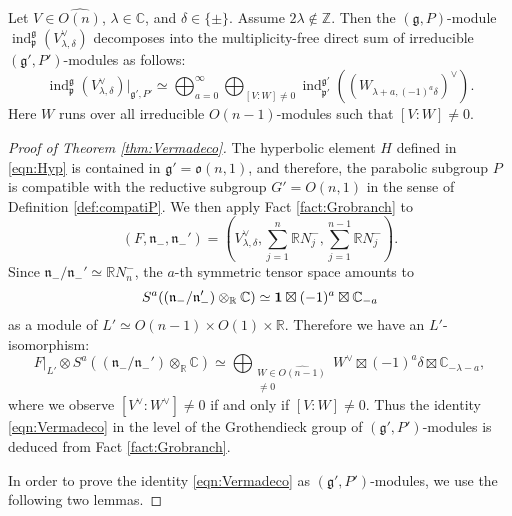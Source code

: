 \begin{theorem}
\label{thm:Vermadeco}
Let $V \in \widehat {O(n)}$, 
 $\lambda \in {\mathbb{C}}$, 
 and $\delta \in \{\pm\}$.  
Assume $2 \lambda \not \in {\mathbb{Z}}$.  
Then the $({\mathfrak{g}},P)$-module 
 ${\operatorname{ind}}_{\mathfrak{p}}^{\mathfrak{g}}
  (V_{\lambda,\delta}^{\vee})$ decomposes
 into the multiplicity-free direct sum of irreducible $({\mathfrak{g}}',P')$-modules
 as follows:
\begin{equation}
\label{eqn:Vermadeco}
 {\operatorname{ind}}_{\mathfrak{p}}^{\mathfrak{g}}
  (V_{\lambda,\delta}^{\vee})|_{{\mathfrak{g}}',P'}
  \simeq
  \bigoplus_{a=0}^{\infty}
  \bigoplus_{[V:W]\ne 0}
  {\operatorname{ind}}_{\mathfrak{p}'}^{\mathfrak{g}'}
   ((W_{\lambda+a,(-1)^a\delta})^{\vee}).  
\end{equation}
Here $W$ runs over all irreducible $O(n-1)$-modules
 such that $[V:W] \ne 0$.  
\end{theorem}

\begin{proof}
[Proof of Theorem \ref{thm:Vermadeco}]
The hyperbolic element $H$ defined in \eqref{eqn:Hyp}
 is contained in ${\mathfrak{g}}' = {\mathfrak{o}}(n,1)$, 
 and therefore, 
 the parabolic subgroup $P$
 is compatible with the reductive subgroup $G'=O(n,1)$
 in the sense of Definition \ref{def:compatiP}.  
We then apply Fact \ref{fact:Grobranch}
 to 
\[
  (F,{\mathfrak{n}}_-,{\mathfrak{n}}_-')
  =
  (V_{\lambda,\delta}^{\vee}, \sum_{j=1}^{n}{\mathbb{R}}N_j^-, \sum_{j=1}^{n-1}{\mathbb{R}}N_j^-).  
\]
Since ${\mathfrak{n}}_-/{\mathfrak{n}}_-' \simeq {\mathbb{R}}N_n^-$, 
 the $a$-th symmetric tensor space amounts to 
\[
  S^a(({\mathfrak{n}}_-/{\mathfrak{n}}_-') \otimes_{\mathbb{R}} {\mathbb{C}})
   \simeq
  {\bf{1}} \boxtimes (-1)^a \boxtimes {\mathbb{C}}_{-a}
\]
 as a module of $L' \simeq O(n-1) \times O(1) \times {\mathbb{R}}$.  
Therefore we have an $L'$-isomorphism:
\[
F|_{L'} \otimes S^a(({\mathfrak{n}}_-/{\mathfrak{n}}_-') \otimes_{\mathbb{R}} {\mathbb{C}})
\simeq
\bigoplus_{\substack {W \in \widehat{O(n-1)} \\ [V:W] \ne 0}} W^{\vee} \boxtimes (-1)^a\delta \boxtimes {\mathbb{C}}_{-\lambda-a}, 
\]
where we observe $[V^{\vee}:W^{\vee}] \ne 0$
 if and only if $[V:W] \ne 0$.  
Thus the identity \eqref{eqn:Vermadeco}
 in the level of the Grothendieck group
 of $({\mathfrak{g}}',P')$-modules
 is deduced from Fact \ref{fact:Grobranch}.  



In order to prove the identity \eqref{eqn:Vermadeco}
 as $({\mathfrak{g}}',P')$-modules, 
 we use the following two lemmas.  
\end{proof}

